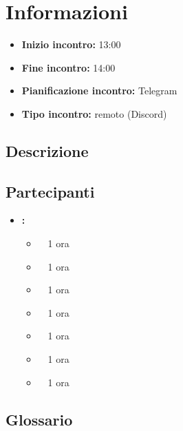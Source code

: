 \section{Informazioni}
\begin{itemize}
	\item \textbf{Inizio incontro:} 13:00
	\item \textbf{Fine incontro:} 14:00
	\item \textbf{Pianificazione incontro:} Telegram
	\item \textbf{Tipo incontro:} remoto (Discord)
\end{itemize}

\subsection{Descrizione}
\DocDescription

\subsection{Partecipanti}

\begin{itemize}
	\item \textbf{\GroupName:}
	\begin{itemize}
		\item \tommaso \ \rightarrow\ 1 ora
		\item \marco \ \rightarrow\ 1 ora
		\item \raul \ \rightarrow\ 1 ora
		\item \sebastiano \ \rightarrow\ 1 ora
		\item \martina \ \rightarrow\ 1 ora
		\item \riccardo \ \rightarrow\ 1 ora
		\item \mattia \ \rightarrow\ 1 ora
	\end{itemize}
\end{itemize}

\subsection{Glossario}
\GlossarioIntroduzione

\clearpage
